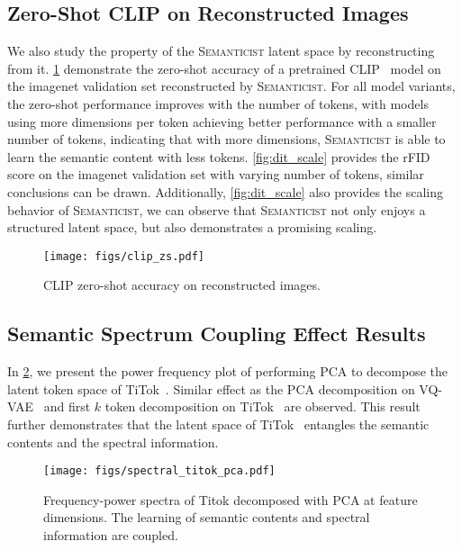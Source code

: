 \documentclass[10pt,twocolumn,letterpaper]{article}
\DeclareRobustCommand{\modelname}{\textsc{Semanticist}\xspace}
\begin{document}
\subsection{Zero-Shot CLIP on Reconstructed Images}
We also study the property of the \modelname latent space by reconstructing from it.
\cref{fig:clip_zs} demonstrate the zero-shot accuracy of a pretrained CLIP~\cite{radford2021clip} model on the imagenet validation set reconstructed by \modelname.
For all model variants, the zero-shot performance improves with the number of tokens, with models using more dimensions per token achieving better performance with a smaller number of tokens, indicating that with more dimensions, \modelname is able to learn the semantic content with less tokens.
\cref{fig:dit_scale} provides the rFID score on the imagenet validation set with varying number of tokens, similar conclusions can be drawn.
Additionally, \cref{fig:dit_scale} also provides the scaling behavior of \modelname, we can observe that \modelname not only enjoys a structured latent space, but also demonstrates a promising scaling.




\begin{figure}
    \centering
    \texttt{[image: figs/clip\_zs.pdf]}
    \caption{CLIP zero-shot accuracy on reconstructed images.}
    \label{fig:clip_zs}
\end{figure}

\subsection{Semantic Spectrum Coupling Effect Results}
In \cref{fig:spectral_titok_pca}, we present the power frequency plot of performing PCA to decompose the latent token space of TiTok~\cite{titok}.
Similar effect as the PCA decomposition on VQ-VAE~\cite{llamagen} and first $k$ token decomposition on TiTok~\cite{titok} are observed.
This result further demonstrates that the latent space of TiTok~\cite{titok} entangles the semantic contents and the spectral information.

\begin{figure}[t]
    \centering
    \texttt{[image: figs/spectral\_titok\_pca.pdf]}
    \caption{Frequency-power spectra of Titok decomposed with PCA at feature dimensions. The learning of semantic contents and spectral information are coupled.}
    \label{fig:spectral_titok_pca}
\end{figure}
\end{document}
